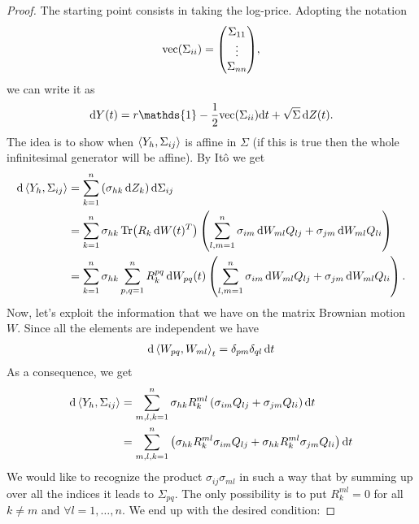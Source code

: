 \begin{proof}
    The starting point consists in taking the log-price. Adopting the notation
    \begin{align*}
        \vect{\Sigma_{ii}} = \mqty(\Sigma_{11} \\ \vdots \\ \Sigma_{nn}),
    \end{align*}
    we can write it as
    \begin{align*}
        \dd Y(t) = r\mathds{1}-\frac{1}{2}\vect{\Sigma_{ii}}\dd t + \sqrt{\Sigma}\,\dd Z(t).
    \end{align*}
    The idea is to show when $\expval{Y_h, \Sigma_{ij}}$ is affine in $\Sigma$ (if this is true then the whole infinitesimal generator will be affine). By Itô we get
    \begin{align*} %
        \dd\expval{Y_h, \Sigma_{ij}} &= \sum_{k=1}^n \left(\sigma_{hk}\,\dd Z_k\right) \dd\Sigma_{ij} \\
        &=
        \sum_{k=1}^n \sigma_{hk} \Tr(R_k\,\dd W(t)^T)\left(\sum_{l,m=1}^n\sigma_{im}\,\dd W_{ml}Q_{lj}+\sigma_{jm}\,\dd W_{ml}Q_{li}\right) \\
        &=
        \sum_{k=1}^n \sigma_{hk} \sum_{p,q=1}^n R_k^{pq}\,\dd W_{pq}(t)\left(\sum_{l,m=1}^n\sigma_{im}\,\dd W_{ml}Q_{lj}+\sigma_{jm}\,\dd W_{ml}Q_{li}\right).
    \end{align*}
    Now, let's exploit the information that we have on the matrix Brownian motion $W$. Since all the elements are independent we have
    \begin{align*}
        \dd\expval{W_{pq},W_{ml}}_t = \delta_{pm}\delta_{ql}\,\dd t
    \end{align*}
    As a consequence, we get
    \begin{align*}
        \dd\expval{Y_h, \Sigma_{ij}} &= \sum_{m,l,k=1}^n \sigma_{hk}R_k^{ml}\left(\sigma_{im}Q_{lj} + \sigma_{jm}Q_{li}\right)\dd t \\
        &=
        \sum_{m,l,k=1}^n \left(\sigma_{hk}R_k^{ml}\sigma_{im}Q_{lj}+\sigma_{hk}R_k^{ml}\sigma_{jm}Q_{li}\right)\dd t
    \end{align*} %
    We would like to recognize the product $\sigma_{ij}\sigma_{ml}$ in such a way that by summing up over all the indices it leads to $\Sigma_{pq}$. The only possibility is to put $R_k^{ml}=0$ for all $k\ne m$ and $\forall l = 1,\dots,n$. We end up with the desired condition:

\end{proof}
